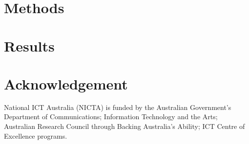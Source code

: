 \documentclass{bioinfo}
\begin{document}
\section{Methods}

\section{Results}

\section*{Acknowledgement}

National ICT Australia (NICTA) is funded by the Australian Government's Department of Communications; 
Information Technology and the Arts;  
Australian Research Council through Backing Australia's Ability; 
ICT Centre of Excellence programs.



%
%
%
%
%
%
%

\vspace{-1em}



\end{document}
